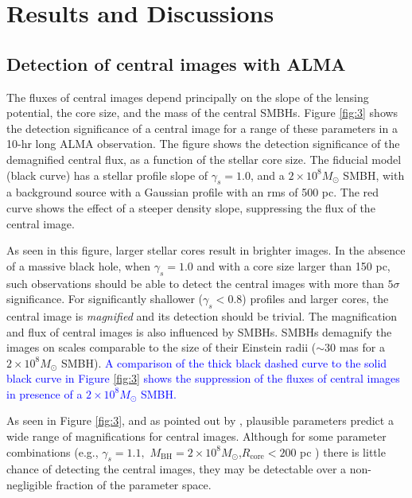 \documentclass[chicago]{emulateapj}
\newcommand{\blue}{\textcolor{blue}}
\newcommand{\red}{\textcolor{red}}
\begin{document}
\section{Results and Discussions}
\subsection{Detection of central images with ALMA}
The fluxes of central images depend principally on the slope of the lensing potential, the core size, and the mass of the central SMBHs.  Figure \ref{fig:3} shows the detection significance of a central image for a range of these parameters in a 10-hr long ALMA observation. 
The figure shows the detection significance of the demagnified central flux, as a function of the stellar core size.
The fiducial model (black curve) has a stellar profile slope of $\gamma_s=1.0$, and a $2\times10^8M_{\odot}$ SMBH, with a background source 
with a Gaussian profile with an rms of 500 pc.  The red curve shows the effect of a steeper density slope, suppressing the flux of the central image. 




As seen in this figure, larger stellar cores result in brighter images. 
In the absence of a massive black hole, when $\gamma_s=1.0$ and with a core size larger than 150 pc, such observations should be able to detect the central images with more than $5\sigma$ significance. For significantly shallower ($\gamma_s<0.8$) profiles and larger cores, the central image is \emph{magnified} and its detection should be trivial.  The magnification and flux of central images is also influenced by SMBHs.
SMBHs demagnify the images on scales comparable to the size of their Einstein radii ($\sim30$ mas for a $2\times10^8M_{\odot}$ SMBH).
\blue{A comparison of the thick black dashed curve to the solid black curve in Figure \ref{fig:3} shows the suppression of the fluxes of central images in presence of a $2\times10^8M_{\odot}$ SMBH.}

As seen in Figure \ref{fig:3}, and as pointed out by \citet{Keeton:03}, plausible parameters predict  a wide range of magnifications for   central images. Although for some parameter combinations (e.g., $\gamma_{s}=1.1,$ $M_{\mathrm{BH}} = 2\times10^8 M_{\odot}$,$R_{\mathrm{core}}<200$ pc ) there is little chance of detecting the central images, they may be detectable over a non-negligible fraction of the parameter space.
\end{document}
